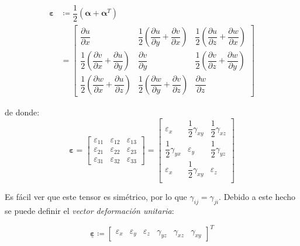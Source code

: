 \begin{equation}
	\begin{split}
		\bm{\varepsilon} & \coloneqq \dfrac{1}{2} \left(\bm{\alpha} + \bm{\alpha}^T \right) \\ &=  \begin{bmatrix}
		\dfrac{\partial u}{\partial x} & \dfrac{1}{2} \left(\dfrac{\partial u}{\partial y} + \dfrac{\partial v}{\partial x}\right) & \dfrac{1}{2} \left(\dfrac{\partial u}{\partial z} + \dfrac{\partial w}{\partial x}\right) \\[5mm]
		\dfrac{1}{2} \left(\dfrac{\partial v}{\partial x} + \dfrac{\partial u}{\partial y}\right) & \dfrac{\partial v}{\partial y} & \dfrac{1}{2} \left(\dfrac{\partial v}{\partial z} + \dfrac{\partial w}{\partial y}\right) \\[5mm]
		\dfrac{1}{2} \left(\dfrac{\partial w}{\partial x} + \dfrac{\partial u}{\partial z}\right) & \dfrac{1}{2} \left(\dfrac{\partial w}{\partial y} + \dfrac{\partial v}{\partial z}\right) & \dfrac{\partial w}{\partial z}
	\end{bmatrix}
	\end{split}
\end{equation}

de donde:
\begin{equation}
	\bm{\varepsilon} = \begin{bmatrix}
		\varepsilon_{11} & \varepsilon_{12} & \varepsilon_{13} \\
		\varepsilon_{21} & \varepsilon_{22} & \varepsilon_{23} \\
		\varepsilon_{31} & \varepsilon_{32} & \varepsilon_{33}
	\end{bmatrix} = \begin{bmatrix}
		\varepsilon_x & \dfrac{1}{2} \gamma_{xy} & \dfrac{1}{2} \gamma_{xz} \\[5mm]
		\dfrac{1}{2} \gamma_{yx} & \varepsilon_y & \dfrac{1}{2} \gamma_{yz} \\[5mm]
		\varepsilon_x & \dfrac{1}{2} \gamma_{xy} & \varepsilon_z \\
	\end{bmatrix}
\end{equation}

Es fácil ver que este tensor es simétrico, por lo que $\gamma_{ij} = \gamma_{ji}$. Debido a este hecho se puede definir el \textit{vector deformación unitaria}:

\begin{equation}
	\underline{\bm{\varepsilon}} \coloneqq \begin{bmatrix}
		\varepsilon_x & \varepsilon_y & \varepsilon_z & \gamma_{yz} & \gamma_{xz} & \gamma_{xy}
	\end{bmatrix}^T
\end{equation}

